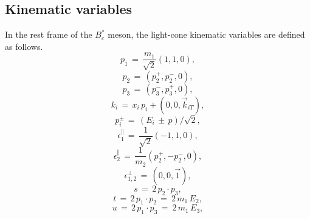 \documentclass[preprint,superscriptaddress,nofootinbib]{revtex4}
\begin{document}
  \subsection{Kinematic variables}
  \label{sec0203}
  In the rest frame of the $B_{c}^{\ast}$ meson, the light-cone
  kinematic variables are defined as follows.
  \begin{equation}
  p_{1}\, =\, \frac{m_{1}}{\sqrt{2}}(1,1,0)
  \label{kine-p1},
  \end{equation}
  \begin{equation}
  p_{2}\, =\, (p_{2}^{+},p_{2}^{-},0)
  \label{kine-p2},
  \end{equation}
  \begin{equation}
  p_{3}\, =\, (p_{3}^{-},p_{3}^{+},0)
  \label{kine-p3},
  \end{equation}
  \begin{equation}
  k_{i}\, =\, x_{i}\,p_{i}+(0,0,\vec{k}_{i{T}})
  \label{kine-ki},
  \end{equation}
  \begin{equation}
  p_{i}^{\pm}\, =\, (E_{i}\,{\pm}\,p)/\sqrt{2}
  \label{kine-pipm},
  \end{equation}
  \begin{equation}
 {\epsilon}_{1}^{{\parallel}}\, =\,\frac{1}{\sqrt{2}}(-1,1,0)
  \label{kine-e1},
  \end{equation}
  \begin{equation}
 {\epsilon}_{2}^{{\parallel}}\, =\, \frac{1}{m_{2}}(p_{2}^{+},-p_{2}^{-},0)
  \label{kine-e2},
  \end{equation}
  \begin{equation}
  {\epsilon}_{1,2}^{\perp}\, =\, (0,0,\vec{1})
  \label{kine-eti},
  \end{equation}
  \begin{equation}
  s\, =\, 2\,p_{2}{\cdot}p_{3}
  \label{kine-s},
  \end{equation}
  \begin{equation}
  t\, =\, 2\,p_{1}{\cdot}p_{2}\, =\ 2\,m_{1}\,E_{2}
  \label{kine-t},
  \end{equation}
  \begin{equation}
  u\, =\, 2\,p_{1}{\cdot}p_{3}\, =\ 2\,m_{1}\,E_{3}
  \label{kine-u},
  \end{equation}
\end{document}
